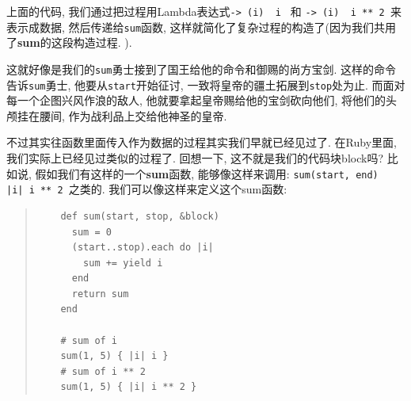 上面的代码, 我们通过把过程用Lambda表达式\texttt{-> (i) { i }} 和 \texttt{-> (i) { i ** 2 }}来表示成数据, 然后传递给\texttt{sum}函数, 这样就简化了复杂过程的构造了(因为我们共用了\textbf{sum}的这段构造过程. ). 

这就好像是我们的\texttt{sum}勇士接到了国王给他的命令和御赐的尚方宝剑. 这样的命令告诉\texttt{sum}勇士, 他要从\texttt{start}开始征讨, 一致将皇帝的疆土拓展到\texttt{stop}处为止. 而面对每一个企图兴风作浪的敌人, 他就要拿起皇帝赐给他的宝剑砍向他们, 将他们的头颅挂在腰间, 作为战利品上交给他神圣的皇帝. 

% 
% 
% 
% 
%         

不过其实往函数里面传入作为数据的过程其实我们早就已经见过了. 在Ruby里面, 我们实际上已经见过类似的过程了. 回想一下, 这不就是我们的代码块block吗? 比如说, 假如我们有这样的一个\textbf{sum}函数, 能够像这样来调用: \texttt{sum(start, end) { |i| i ** 2 }}之类的. 我们可以像这样来定义这个sum函数: 

\begin{quotation}
  \begin{verbatim}
    def sum(start, stop, &block)
      sum = 0
      (start..stop).each do |i|
        sum += yield i
      end
      return sum
    end

    # sum of i
    sum(1, 5) { |i| i }
    # sum of i ** 2
    sum(1, 5) { |i| i ** 2 }
  \end{verbatim}
\end{quotation}

